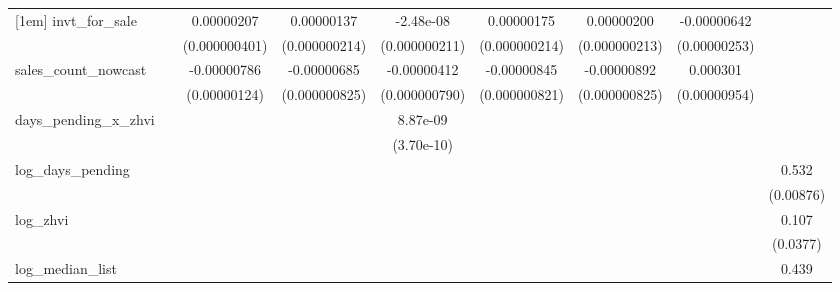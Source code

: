 {\begin{tabular}{l*{8}{c}}
[1em]
invt\_for\_sale&                     &  0.00000207\sym{***}&  0.00000137\sym{***}&   -2.48e-08         &  0.00000175\sym{***}&  0.00000200\sym{***}& -0.00000642\sym{*}  &                     \\
            &                     &(0.000000401)         &(0.000000214)         &(0.000000211)         &(0.000000214)         &(0.000000213)         &(0.00000253)         &                     \\
[1em]
sales\_count\_nowcast&                     & -0.00000786\sym{***}& -0.00000685\sym{***}& -0.00000412\sym{***}& -0.00000845\sym{***}& -0.00000892\sym{***}&    0.000301\sym{***}&                     \\
            &                     &(0.00000124)         &(0.000000825)         &(0.000000790)         &(0.000000821)         &(0.000000825)         &(0.00000954)         &                     \\
[1em]
days\_pending\_x\_zhvi&                     &                     &                     &    8.87e-09\sym{***}&                     &                     &                     &                     \\
            &                     &                     &                     &  (3.70e-10)         &                     &                     &                     &                     \\
[1em]
log\_days\_pending&                     &                     &                     &                     &                     &                     &                     &       0.532\sym{***}\\
            &                     &                     &                     &                     &                     &                     &                     &   (0.00876)         \\
[1em]
log\_zhvi    &                     &                     &                     &                     &                     &                     &                     &       0.107\sym{**} \\
            &                     &                     &                     &                     &                     &                     &                     &    (0.0377)         \\
[1em]
log\_median\_list&                     &                     &                     &                     &                     &                     &                     &       0.439\sym{***}\\

\end{tabular}}
